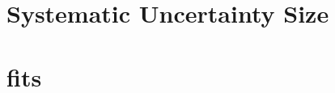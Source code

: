 \documentclass{report}
\begin{document}
\section{Systematic Uncertainty Size}

\clearpage
\section{\subsdzero fits}




\end{document}

